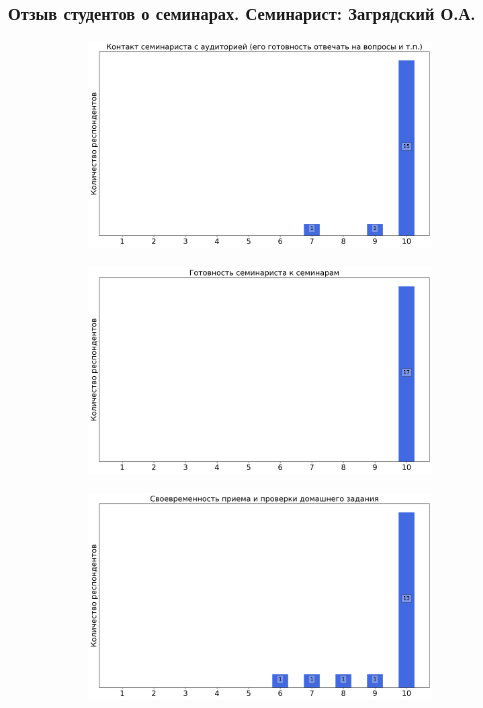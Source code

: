 	\subsubsection{Отзыв студентов о семинарах. Семинарист: Загрядский О.А.}
		\begin{figure}[H]
			\centering
			\begin{subfigure}[b]{0.45\textwidth}
				\centering
				\includegraphics[width=\textwidth]{images/1 course/Математический анализ/seminarists-marks-Загрядский О.А.-0.png}
			\end{subfigure}
			\begin{subfigure}[b]{0.45\textwidth}
				\centering
				\includegraphics[width=\textwidth]{images/1 course/Математический анализ/seminarists-marks-Загрядский О.А.-1.png}
			\end{subfigure}
			\begin{subfigure}[b]{0.45\textwidth}
				\centering
				\includegraphics[width=\textwidth]{images/1 course/Математический анализ/seminarists-marks-Загрядский О.А.-2.png}

\end{subfigure}
\end{figure}
